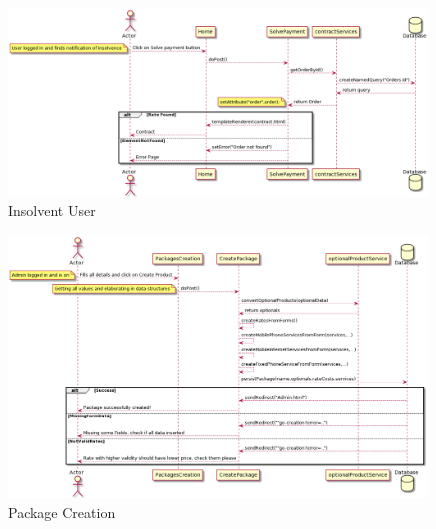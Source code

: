 \documentclass{article}
\begin{document}
\newpage
\begin{figure}[hbt!]
\centering
\includegraphics[width=0.99\textwidth]{Insolvent.png}
\caption{Insolvent User}
\end{figure}

\begin{figure}[hbt!]
\centering
\includegraphics[width=0.99\textwidth]{Creation.png}
\caption{Package Creation}
\end{figure}
\end{document}
